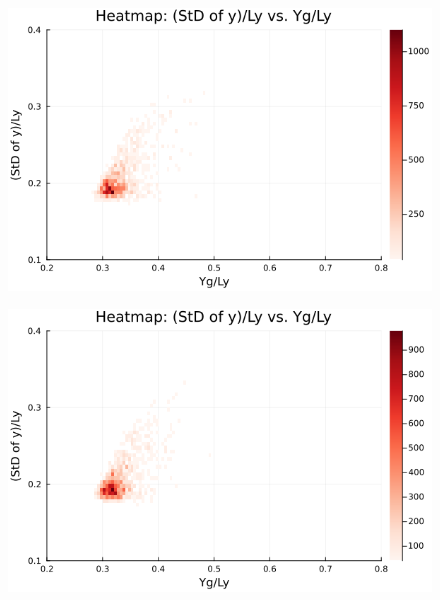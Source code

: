 \begin{figure}[H]
  \centering
  \includegraphics[scale=0.6]{image/RaRtmap10_heat/2023-12-28T12:38:51.270_map_10times_chi1.265_Ay50_rho0.4_T0.43_dT0.04_Rd0.0_Rt0.0_Ra0.938769_g0.0003999718779659611_run4.0e8.png}
  \label{}
\end{figure}

\begin{figure}[H]
  \centering
  \includegraphics[scale=0.6]{image/RaRtmap10_heat/2023-12-28T12:38:51.353_map_10times_chi1.265_Ay50_rho0.4_T0.43_dT0.04_Rd0.0_Rt0.0_Ra1.4081535_g0.0003999718779659611_run4.0e8.png}
  \label{}
\end{figure}

